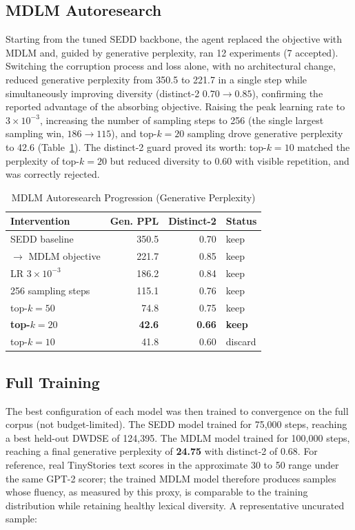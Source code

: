 \documentclass[conference]{IEEEtran}
\begin{document}
\subsection{MDLM Autoresearch}
Starting from the tuned SEDD backbone, the agent replaced the objective
with MDLM and, guided by generative perplexity, ran 12 experiments
(7 accepted). Switching the corruption process and loss alone, with no
architectural change, reduced generative perplexity from 350.5 to
221.7 in a single step while simultaneously improving diversity
(distinct-2 $0.70 \to 0.85$), confirming the reported advantage of the
absorbing objective. Raising the peak learning rate to $3\times10^{-3}$,
increasing the number of sampling steps to 256 (the single largest
sampling win, $186\to115$), and top-$k{=}20$ sampling drove generative
perplexity to 42.6 (Table~\ref{tab:mdlm}). The distinct-2 guard proved
its worth: top-$k{=}10$ matched the perplexity of top-$k{=}20$ but
reduced diversity to 0.60 with visible repetition, and was correctly
rejected.

\begin{table}[t]
\caption{MDLM Autoresearch Progression (Generative Perplexity)}
\label{tab:mdlm}
\centering
\begin{tabular}{@{}lrrl@{}}
\toprule
\textbf{Intervention} & \textbf{Gen. PPL} & \textbf{Distinct-2} & \textbf{Status} \\
\midrule
SEDD baseline & 350.5 & 0.70 & keep \\
$\to$ MDLM objective & 221.7 & 0.85 & keep \\
LR $3\times10^{-3}$ & 186.2 & 0.84 & keep \\
256 sampling steps & 115.1 & 0.76 & keep \\
top-$k{=}50$ & 74.8 & 0.75 & keep \\
\textbf{top-$k{=}20$} & \textbf{42.6} & \textbf{0.66} & \textbf{keep} \\
top-$k{=}10$ & 41.8 & 0.60 & discard \\
\bottomrule
\end{tabular}
\end{table}

\subsection{Full Training}
The best configuration of each model was then trained to convergence on
the full corpus (not budget-limited). The SEDD model trained for
75{,}000 steps, reaching a best held-out DWDSE of 124{,}395. The MDLM
model trained for 100{,}000 steps, reaching a final generative
perplexity of \textbf{24.75} with distinct-2 of 0.68. For reference,
real TinyStories text scores in the approximate 30 to 50 range under the
same GPT-2 scorer; the trained MDLM model therefore produces samples
whose fluency, as measured by this proxy, is comparable to the training
distribution while retaining healthy lexical diversity. A representative
uncurated sample:
\end{document}
